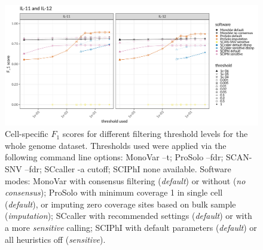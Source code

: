\documentclass[authoryear,preprint,11pt]{scrartcl}
\begin{document}
\begin{figure}[!tpb]
  \includegraphics[width=\linewidth]{figs/Dong2017/Dong2017_prosolo-monovar-scansnv-sccaller_F1_plot.pdf}
 \caption{
 Cell-specific $F_1$ scores for different filtering threshold levels for the whole genome dataset.\newline \footnotesize
  Thresholds used were applied via the following command line options:
  MonoVar {\ttfamily --t};
  ProSolo {\ttfamily --fdr};
  SCAN-SNV {\ttfamily --fdr};
  SCcaller {\ttfamily -a cutoff};
  SCIPhI {\ttfamily none available}.
  Software modes:
  MonoVar with consensus filtering ({\itshape default}) or without ({\itshape no consensus});
  ProSolo with minimum coverage 1 in single cell ({\itshape default}), or imputing zero coverage sites based on bulk sample ({\itshape imputation});
  SCcaller with recommended settings ({\itshape default}) or with a more {\itshape sensitive} calling;
  SCIPhI with default parameters ({\itshape default}) or all heuristics off ({\itshape sensitive}).
 }
 \label{fig:F_1-scores_Dong2017}
\end{figure}
\end{document}
